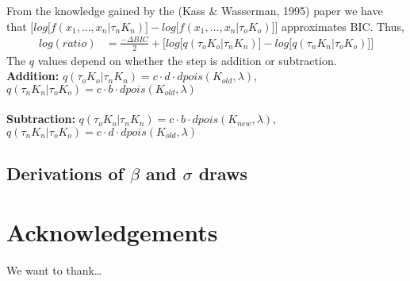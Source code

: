 \documentclass[submit]{smj}
\begin{document}
From the knowledge gained by the (Kass $\&$ Wasserman, 1995) paper we have that $\Big[ log \big[ f(x_1,\dots,x_n | \tau_{n} K_{n}) \big] -  log \big[ f(x_1,\dots,x_n | \tau_{o} K_{o})\big] \Big] $ approximates BIC. Thus,
\begin{align*}
log(ratio) &= \frac{- \Delta BIC}{2} + 
\Big[ log \big[ q(\tau_{o} K_{o} | \tau_{n} K_{n}) \big] - log \big[ q(\tau_{n} K_{n}| \tau_{o} K_{o})  \big] \Big]
\end{align*}
The $q$ values depend on whether the step is addition or subtraction. \\
\textbf{Addition:} 
$q(\tau_{o} K_{o} | \tau_{n} K_{n}) = c \cdot d \cdot dpois(K_{old} , \lambda)$, $q(\tau_{n} K_{n} | \tau_{o} K_{o}) = c \cdot b \cdot dpois(K_{old} , \lambda)$ \\
\\
\textbf{Subtraction:}
$q(\tau_{o} K_{o} | \tau_{n} K_{n}) = c \cdot b \cdot dpois(K_{new} , \lambda)$, $q(\tau_{n} K_{n} | \tau_{o} K_{o}) = c \cdot d \cdot dpois(K_{old} , \lambda)$ \\




\subsection{Derivations of $\beta$ and $\sigma$ draws}




\section*{Acknowledgements}
We want to thank\ldots



\end{document}
